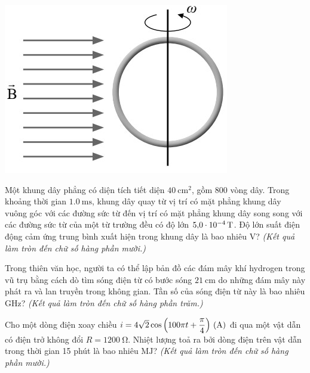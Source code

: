 \begin{ex}
	{\includegraphics[scale=0.4]{figs/VN12-Y24-PH-SYL-025P-14}}
	\loigiai{
		
	}
\end{ex}
\begin{ex}
	Một khung dây phẳng có diện tích tiết diện $\SI{40}{\centi\meter^2}$, gồm 800 vòng dây. Trong khoảng thời gian $\SI{1.0}{\milli\second}$, khung dây quay từ vị trí có mặt phẳng khung dây vuông góc với các đường sức từ đến vị trí có mặt phẳng khung dây song song với các đường sức từ của một từ trường đều có độ lớn $\SI{5.0E-4}{\tesla}$. Độ lớn suất điện động cảm ứng trung bình xuất hiện trong khung dây là bao nhiêu $\si{\volt}$? \textit{(Kết quả làm tròn đến chữ số hàng phần mười.)}
	\loigiai{
		
	}
\end{ex}
\begin{ex}
	Trong thiên văn học, người ta có thể lập bản đồ các đám mây khí hydrogen trong vũ trụ bằng cách dò tìm sóng điện từ có bước sóng $\SI{21}{\centi\meter}$ do những đám mây này phát ra và lan truyền trong không gian. Tần số của sóng điện từ này là bao nhiêu $\si{\giga\hertz}$? \textit{(Kết quả làm tròn đến chữ số hàng phần trăm.)}
	\loigiai{
		
	}
\end{ex}
\begin{ex}
	Cho một dòng điện xoay chiều $i=\xsi{4 \sqrt{2} \cos \left(100 \pi t+\dfrac{\pi}{4}\right)}{\left(\ampere\right)}$ đi qua một vật dẫn có điện trở không đổi $R=\SI{1200}{\ohm}$. Nhiệt lượng toả ra bởi dòng điện trên vật dẫn trong thời gian 15 phút là bao nhiêu $\si{\mega\joule}$? \textit{(Kết quả làm tròn đến chữ số hàng phần mười.)}
	\loigiai{
		
	}
\end{ex}
